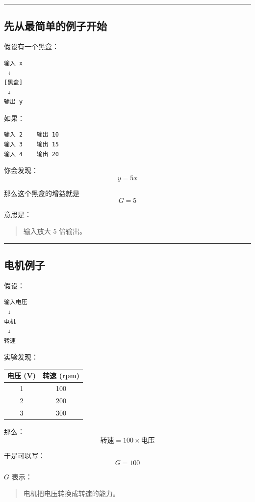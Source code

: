 \documentclass[UTF8,a4paper,11pt]{ctexart}
\begin{document}
\bigskip\noindent\rule{\linewidth}{0.4pt}\bigskip

\subsection{先从最简单的例子开始}

假设有一个黑盒：

\begin{verbatim}
输入 x
 ↓
[黑盒]
 ↓
输出 y
\end{verbatim}

如果：

\begin{verbatim}
输入 2    输出 10
输入 3    输出 15
输入 4    输出 20
\end{verbatim}

你会发现：
\[
y=5x
\]

那么这个黑盒的增益就是
\[
G=5
\]

意思是：

\begin{quote}
输入放大 5 倍输出。
\end{quote}

\bigskip\noindent\rule{\linewidth}{0.4pt}\bigskip

\subsection{电机例子}

假设：

\begin{verbatim}
输入电压
 ↓
电机
 ↓
转速
\end{verbatim}

实验发现：

\begin{center}
\begin{tabular}{cc}
\toprule
电压 (V) & 转速 (rpm) \\
\midrule
1 & 100 \\
2 & 200 \\
3 & 300 \\
\bottomrule
\end{tabular}
\end{center}

那么：
\[
\text{转速}=100\times \text{电压}
\]

于是可以写：
\[
G=100
\]

$G$ 表示：

\begin{quote}
电机把电压转换成转速的能力。
\end{quote}
\end{document}

